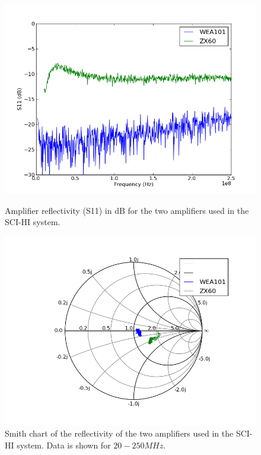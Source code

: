 \begin{figure}[htb]
\centering
\begin{minipage}[b]{0.47\textwidth}
\centering
\includegraphics[width=0.95\linewidth]{SCIHI_system/figures/amp_S11_dB.png}
\caption{Amplifier reflectivity (S11) in dB for the two amplifiers used in the SCI-HI system.}
\label{Fig:amp_comp_dB}
\end{minipage}%
\begin{minipage}[b]{0.02\textwidth}
\hspace{1cm}
\end{minipage}%
\begin{minipage}[b]{0.47\textwidth}
\centering
\includegraphics[width=0.95\linewidth]{SCIHI_system/figures/amp_S11_Smith.png}
\caption{Smith chart of the reflectivity of the two amplifiers used in the SCI-HI system. Data is shown for $20-250 MHz$. }
\label{Fig:amp_comp_Smith}
\end{minipage}
\end{figure}

